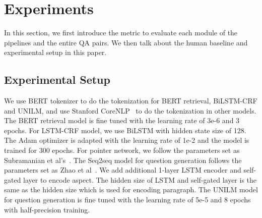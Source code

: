 \section{Experiments}
\label{sec:eval}
In this section, we first introduce the metric to evaluate each module of the pipelines and the entire QA pairs.
We then talk about the human baseline and experimental setup in this paper.

\subsection{Experimental Setup}
We use BERT tokenizer to do the tokenization for BERT retrieval, BiLSTM-CRF and UNILM, and use Stanford CoreNLP~\cite{manning-EtAl:2014:P14-5} to do the tokenization in other models.
The BERT retrieval model is fine tuned with the learning rate of 3e-6 and 3 epochs.
For LSTM-CRF model, we use BiLSTM with hidden state size of 128.
The Adam optimizer is adapted with the learning rate of 1e-2 and the model is trained for 300 epochs.
For pointer network, we follow the parameters set as Subramanian et al's~.
The Seq2seq model for question generation follows the parameters set as Zhao et al~. We add additional 1-layer LSTM encoder and self-gated layer to encode aspect. The hidden size of LSTM and self-gated layer is the same as the hidden size which is used for encoding paragraph.
The UNILM model for question generation is fine tuned with the learning rate of 5e-5 and 8 epochs with half-precision training.